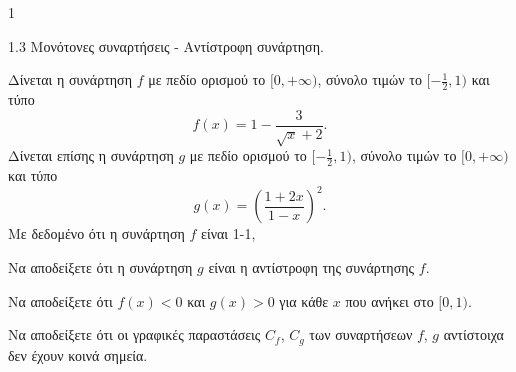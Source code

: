 \begin{ylh}{1}
    \item 1.3 Μονότονες συναρτήσεις - Αντίστροφη συνάρτηση.
\end{ylh}
Δίνεται η συνάρτηση $f$ με πεδίο ορισμού το $[0,+\infty)$, σύνολο τιμών το $[-\frac{1}{2},1)$ και τύπο
\[ f(x)=1-\frac{3}{\sqrt{x}+2}. \]
Δίνεται επίσης η συνάρτηση $g$ με πεδίο ορισμού το $[-\frac{1}{2},1)$, σύνολο τιμών το $[0,+\infty)$ και τύπο
\[ g(x)=\left(\frac{1+2x}{1-x}\right)^2. \]
Με δεδομένο ότι η συνάρτηση $f$ είναι 1-1,

\begin{alist}
    \item Να αποδείξετε ότι η συνάρτηση $g$ είναι η αντίστροφη της συνάρτησης $f$. 
    \item Να αποδείξετε ότι $f(x)<0$ και $g(x)>0$ για κάθε $x$ που ανήκει στο $[0,1)$. 
    \item Να αποδείξετε ότι οι γραφικές παραστάσεις $C_f$, $C_g$ των συναρτήσεων $f$, $g$ αντίστοιχα δεν έχουν κοινά σημεία. 
\end{alist}